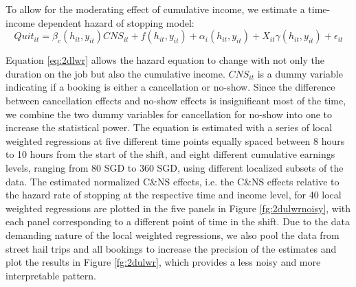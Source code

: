\documentclass[reviewmode]{restat}
\begin{document}
To allow for the moderating effect of cumulative income, we estimate a time-income dependent hazard of stopping model:
\begin{equation}
    \label{eq:2dlwr}
    Quit_{it} = \beta_c(h_{it}, y_{it}) {CNS}_{it} + f(h_{it}, y_{it}) + \alpha_{i}(h_{it}, y_{it}) + X_{it}\gamma(h_{it}, y_{it}) + \epsilon_{it}
\end{equation}

Equation \eqref{eq:2dlwr} allows the hazard equation to change with not only the duration on the job but also the cumulative income. $CNS_{it}$ is a dummy variable indicating if a booking is either a cancellation or no-show.  Since the difference between cancellation effects and no-show effects is insignificant most of the time, we combine the two dummy variables for cancellation for no-show into one to increase the statistical power. The equation is estimated with a series of local weighted regressions at five different time points equally spaced between 8 hours to 10 hours from the start of the shift, and eight different cumulative earnings levels, ranging from 80 SGD to 360 SGD, using different localized subsets of the data.  The estimated normalized C\&NS effects, i.e. the C\&NS effects relative to the hazard rate of stopping at the respective time and income level, for 40 local weighted regressions are plotted in the five panels in Figure \ref{fg:2dulwrnoisy}, with each panel corresponding to a different point of time in the shift. Due to the data demanding nature of the local weighted regressions, we also pool the data from street hail trips and all bookings to increase the precision of the estimates and plot the results in Figure \ref{fg:2dulwr}, which provides a less noisy and more interpretable pattern.
\end{document}
